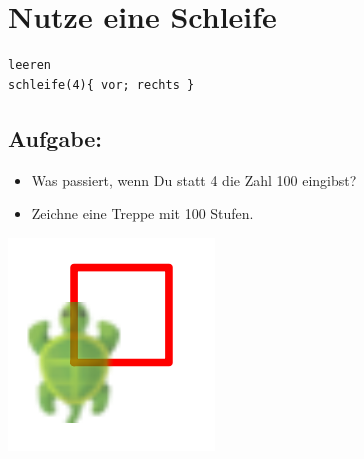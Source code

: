\chapter{Nutze eine Schleife}
\begin{multicols}{2}

\begin{lstlisting}[basicstyle={\ttfamily\fontsize{30}{36}\selectfont},numbers=none]
leeren
schleife(4){ vor; rechts }
\end{lstlisting}
        
\section*{\color{BrickRed}Aufgabe:}


\begin{itemize}

\item {Was passiert, wenn Du statt 4 die Zahl 100 eingibst?}
\item {Zeichne eine Treppe mit 100 Stufen.}

\end{itemize}



\columnbreak

\begin{center}
\includegraphics{../img/square.png}
\end{center}

\end{multicols}

